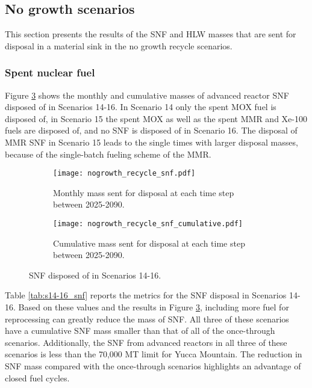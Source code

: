 \subsection{No growth scenarios}
This section presents the results of the \gls{SNF} and 
\gls{HLW} masses that are sent for disposal in a 
material sink in the no growth recycle scenarios. 

\subsubsection{Spent nuclear fuel}
Figure \ref{fig:nogrowth_recycle_snf} shows the monthly and 
cumulative masses of advanced reactor \gls{SNF} disposed of 
in Scenarios 14-16. In Scenario 14 only the spent \gls{MOX} 
fuel is disposed of, in Scenario 15 the spent \gls{MOX} as 
well as the spent \gls{MMR} and Xe-100 fuels are disposed of, 
and no \gls{SNF} is disposed of in Scenario 16. The disposal of 
\gls{MMR} \gls{SNF} in Scenario 15 leads to the single times 
with larger disposal masses, because of the single-batch 
fueling scheme of the \gls{MMR}. 

\begin{figure}[h!]
    \centering
    \begin{subfigure}[b]{0.49\textwidth}
        \centering
        \texttt{[image: nogrowth\_recycle\_snf.pdf]}
        \caption{Monthly mass sent for disposal 
        at each time step between 2025-2090.}
        \label{fig:nogrowth_recycle_snf_all}
    \end{subfigure}
    \hfill
    \begin{subfigure}[b]{0.49\textwidth}
        \centering
        \texttt{[image: nogrowth\_recycle\_snf\_cumulative.pdf]}
        \caption{Cumulative mass sent for disposal 
        at each time step between 2025-2090.}
        \label{fig:nogrowth_recycle_snf_cumulative}
    \end{subfigure}
       \caption{\gls{SNF} disposed of in Scenarios 14-16.}
       \label{fig:nogrowth_recycle_snf}
\end{figure}

Table \ref{tab:s14-16_snf} reports the metrics for the \gls{SNF} disposal 
in Scenarios 14-16. Based on these values and the results in 
Figure \ref{fig:nogrowth_recycle_snf}, including more fuel for 
reprocessing can greatly reduce the mass of \gls{SNF}. All three of 
these scenarios have a cumulative \gls{SNF} mass smaller than 
that of all of the once-through scenarios. Additionally, 
the \gls{SNF} from advanced reactors in all three of these scenarios 
is less than the 70,000 MT limit for Yucca Mountain. The reduction in 
\gls{SNF} mass compared with the once-through scenarios highlights 
an advantage of closed fuel cycles. 

